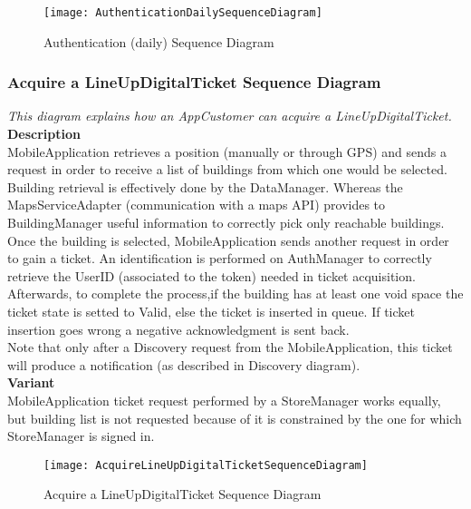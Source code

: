 \newpage
\begin{figure}[H]
 \centering
 \texttt{[image: AuthenticationDailySequenceDiagram]}
 \caption{Authentication (daily) Sequence Diagram}
 \end{figure}

\newpage
\subsubsection{ Acquire a LineUpDigitalTicket Sequence Diagram}
\textit{This diagram explains how an AppCustomer can acquire a LineUpDigitalTicket.\\}
\textbf{Description\\}
MobileApplication retrieves a position (manually or through GPS) and sends a request in order to receive a list of buildings from which one would be selected. Building retrieval is effectively done by the DataManager. Whereas the MapsServiceAdapter (communication with a maps API) provides to BuildingManager useful information to correctly pick only reachable buildings.\\
Once the building is selected, MobileApplication sends another request in order to gain a ticket. An identification is performed on AuthManager to correctly retrieve the UserID (associated to the token) needed in ticket acquisition. Afterwards, to complete the process,if the building has at least one void space the ticket state is setted to Valid, else the ticket is inserted in queue.
If ticket insertion goes wrong a negative acknowledgment is sent back.\\
Note that only after a Discovery request from the MobileApplication, this ticket will produce a notification (as described in Discovery diagram).\\
\textbf{Variant\\}
MobileApplication ticket request performed by a StoreManager works equally, but building list is not requested because of it is constrained by the one for which StoreManager is signed in. \\

\begin{figure}[H]
 \centering
 \texttt{[image: AcquireLineUpDigitalTicketSequenceDiagram]}
 \caption{ Acquire a LineUpDigitalTicket Sequence Diagram}
 \end{figure}

\newpage
